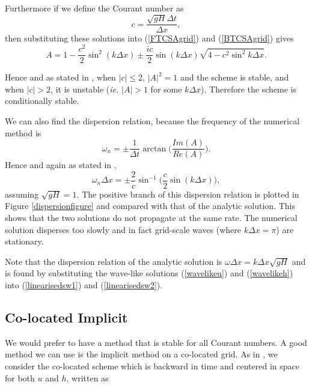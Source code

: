 \documentclass[a4paper, 10pt, notitlepage]{article}
\begin{document}
Furthermore if we define the Courant number as
\begin{equation}\label{Courantnumber}
c = \frac{\sqrt{gH}\Delta t}{\Delta x},
\end{equation}
then substituting these solutions into (\ref{FTCSAgrid}) and (\ref{BTCSAgrid}) gives
\begin{equation}
A = 1 - \frac{c^{2}}{2} \sin^{2}(k\Delta x) \pm \frac{ic}{2}\sin(k\Delta x)\sqrt{4 - c^{2}\sin^{2}k\Delta x}.
\end{equation} 
 
Hence and as stated in \cite{MPE textbook}, when $\lvert c \rvert \leq 2$, $\lvert A \rvert^{2} = 1$ and the scheme is stable, and when $\lvert c \rvert > 2$, it is unstable (\textit{ie.} $\vert A \rvert > 1$ for some $k\Delta x$). Therefore the scheme is conditionally stable.
 
We can also find the dispersion relation, because the frequency of the numerical method is 
\begin{equation} \label{frequency}
\omega_{n} = \pm \frac{1}{\Delta t} \arctan\bigg(\frac{Im(A)}{Re(A)}\bigg).
\end{equation}
Hence and again as stated in \cite{MPE textbook}, 
\begin{equation}
\omega_{n}\Delta x = \pm \frac{2}{c} \sin^{-1} \bigg(\frac{c}{2}\sin(k\Delta x)\bigg),
\end{equation}
assuming $\sqrt{gH} = 1$. The positive branch of this dispersion relation is plotted in Figure \ref{dispersionfigure} and compared with that of the analytic solution. This shows that the two solutions do not propagate at the same rate. The numerical solution disperses too slowly and in fact grid-scale waves (where $k\Delta x = \pi$) are stationary.

Note that the dispersion relation of the analytic solution is $\omega\Delta x = k\Delta x\sqrt{gH}$ and is found by substituting the wave-like solutions (\ref{wavelikeu}) and (\ref{wavelikeh}) into (\ref{linearisedsw1}) and (\ref{linearisedsw2}). 

\subsection{Co-located Implicit}
We would prefer to have a method that is stable for all Courant numbers. A good method we can use is the implicit method on a co-located grid. As in \cite{MPE textbook}, we consider the co-located scheme which is backward in time and centered in space for both $u$ and $h$, written as
\end{document}
